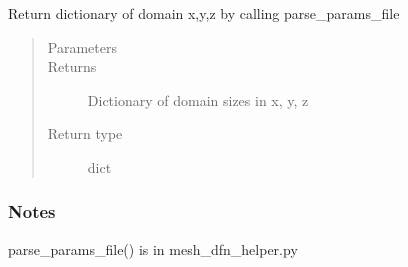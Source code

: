 \documentclass[letterpaper,10pt,english]{sphinxmanual}
\begin{document}
\begin{fulllineitems}
\label{\detokenize{pydfnworks:pydfnworks.dfnFlow.mass_balance.get_domain}}
Return dictionary of domain x,y,z by calling parse\_params\_file
\begin{quote}\begin{description}
\item[{Parameters}] \leavevmode
{} \textendash{} 

\item[{Returns}] \leavevmode
{} \textendash{} Dictionary of domain sizes in x, y, z

\item[{Return type}] \leavevmode
dict

\end{description}\end{quote}
\subsubsection*{Notes}

parse\_params\_file() is in mesh\_dfn\_helper.py

\end{fulllineitems}

\end{document}
